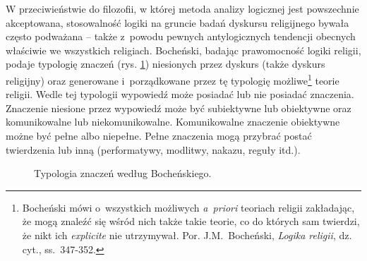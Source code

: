 W przeciwieństwie do filozofii, w której metoda analizy logicznej jest powszechnie akceptowana, stosowalność logiki na gruncie badań dyskursu religijnego bywała często podważana -- także z~powodu pewnych antylogicznych tendencji obecnych właściwie we wszystkich religiach.
Bocheński, badając prawomocność logiki religii, podaje typologię znaczeń (rys. \ref{sil-boch-typ}) niesionych przez dyskurs (także dyskurs religijny) oraz generowane i~porządkowane przez tę typologię możliwe\footnote{Bocheński mówi o~wszystkich możliwych \textit{a~priori} teoriach religii zakładając, że mogą znaleźć się wśród nich także takie teorie, co do których sam twierdzi, że nikt ich \textit{explicite} nie utrzymywał. Por. J.M.~Bocheński, \textit{Logika religii}, dz. cyt., ss.~347-352.} teorie religii. Wedle tej typologii wypowiedź może posiadać lub nie posiadać znaczenia. Znaczenie niesione przez wypowiedź może być subiektywne lub obiektywne oraz komunikowalne lub niekomunikowalne. Komunikowalne znaczenie obiektywne możne być pełne albo niepełne. Pełne znaczenia mogą przybrać postać twierdzenia lub inną (performatywy, modlitwy, nakazu, reguły itd.).
\begin{figure}[H]
\begin{center}

\caption[Typologia znaczeń według Bocheńskiego]{Typologia znaczeń według Bocheńskiego\footnotemark.}\label{sil-boch-typ}
\end{center}
\end{figure}


